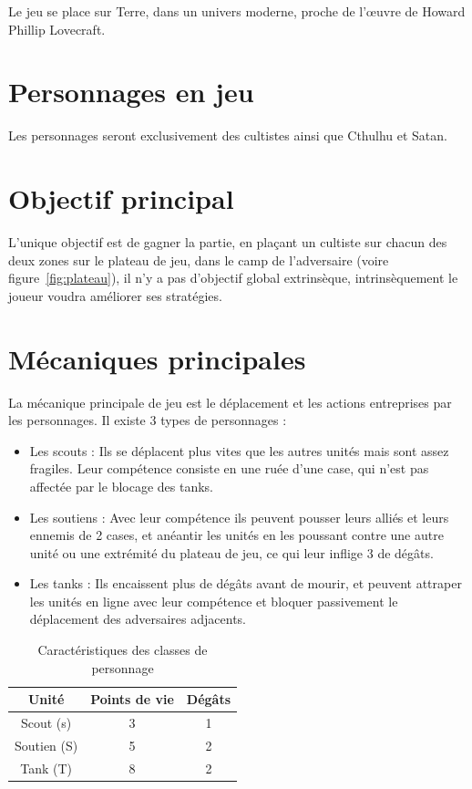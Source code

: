 \documentclass[a4paper]{scrreprt}
\begin{document}
Le jeu se place sur Terre, dans un univers moderne, proche de l'\oe uvre de Howard Phillip Lovecraft.

\section{Personnages en jeu}
Les personnages seront exclusivement des cultistes ainsi que Cthulhu et Satan.

\section{Objectif principal}

L'unique objectif est de gagner la partie, en plaçant un cultiste sur chacun des deux zones sur le plateau de jeu, dans le camp de l'adversaire (voire figure~\ref{fig:plateau}), il n'y a pas d'objectif global extrinsèque, intrinsèquement le joueur voudra améliorer ses stratégies.

\section{Mécaniques principales}

La mécanique principale de jeu est le déplacement et les actions entreprises par les personnages. Il existe 3 types de personnages :
\begin{itemize}
    \item Les scouts : Ils se déplacent plus vites que les autres unités mais sont assez fragiles. Leur compétence consiste en une ruée d'une case, qui n'est pas affectée par le blocage des tanks.
    \item Les soutiens : Avec leur compétence ils peuvent pousser leurs alliés et leurs ennemis de 2 cases, et anéantir les unités en les poussant contre une autre unité ou une extrémité du plateau de jeu, ce qui leur inflige 3 de dégâts.
    \item Les tanks : Ils encaissent plus de dégâts avant de mourir, et peuvent attraper les unités en ligne avec leur compétence et bloquer passivement le déplacement des adversaires adjacents.
\end{itemize}

\begin{table}
    \centering
    \begin{tabular}{|c|c|c|}
        \hline
        Unité & Points de vie & Dégâts \\
        \hline
        \hline
        Scout (s) & 3 & 1\\ \hline
        Soutien (S) & 5 & 2\\ \hline
        Tank (T) & 8 & 2\\ \hline
    \end{tabular}
    \caption{Caractéristiques des classes de personnage}
    \label{tab:tabstats}
\end{table}
\end{document}
